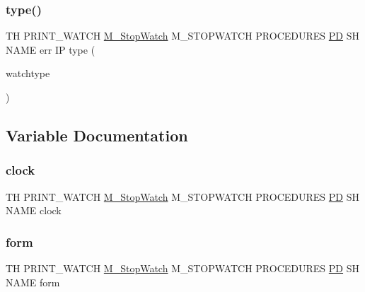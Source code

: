 \mbox{\label{print__watch_83_8txt_abac438c111a8b03ed5b72e0e49efe1c0}} 
\subsubsection{\texorpdfstring{type()}{type()}}
{\footnotesize\ttfamily TH P\+R\+I\+N\+T\+\_\+\+W\+A\+T\+CH \hyperlink{option__stopwatch_83_8txt_aa2011fc45a5e502e87ee50996a8a9305}{M\+\_\+\+Stop\+Watch} M\+\_\+\+S\+T\+O\+P\+W\+A\+T\+CH P\+R\+O\+C\+E\+D\+U\+R\+ES \hyperlink{what__overview_81_8txt_a85f26da5a4481fbdb0d9c79f2b94de3e}{PD} SH N\+A\+ME err IP type (\begin{DoxyParamCaption}\item[{watchtype}]{ }\end{DoxyParamCaption})}



\subsection{Variable Documentation}
\mbox{\label{print__watch_83_8txt_a6b008a5efeabe5de2785214b5e3ba69d}} 
\subsubsection{\texorpdfstring{clock}{clock}}
{\footnotesize\ttfamily TH P\+R\+I\+N\+T\+\_\+\+W\+A\+T\+CH \hyperlink{option__stopwatch_83_8txt_aa2011fc45a5e502e87ee50996a8a9305}{M\+\_\+\+Stop\+Watch} M\+\_\+\+S\+T\+O\+P\+W\+A\+T\+CH P\+R\+O\+C\+E\+D\+U\+R\+ES \hyperlink{what__overview_81_8txt_a85f26da5a4481fbdb0d9c79f2b94de3e}{PD} SH N\+A\+ME clock}

\mbox{\label{print__watch_83_8txt_a8fdbaaece3b2ad2ab6982e68e7539f04}} 
\subsubsection{\texorpdfstring{form}{form}}
{\footnotesize\ttfamily TH P\+R\+I\+N\+T\+\_\+\+W\+A\+T\+CH \hyperlink{option__stopwatch_83_8txt_aa2011fc45a5e502e87ee50996a8a9305}{M\+\_\+\+Stop\+Watch} M\+\_\+\+S\+T\+O\+P\+W\+A\+T\+CH P\+R\+O\+C\+E\+D\+U\+R\+ES \hyperlink{what__overview_81_8txt_a85f26da5a4481fbdb0d9c79f2b94de3e}{PD} SH N\+A\+ME form}

